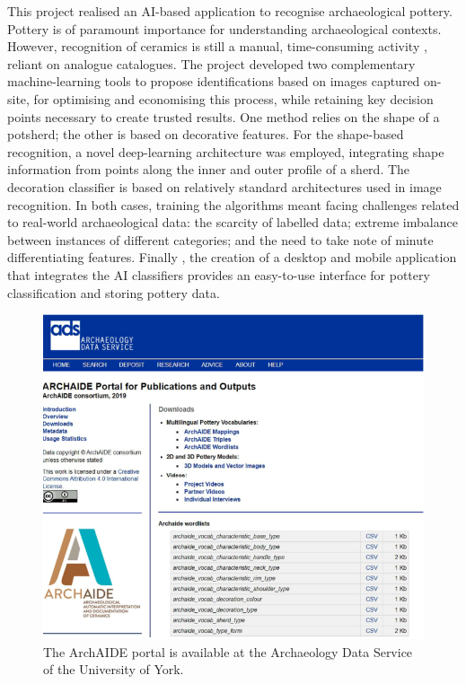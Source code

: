 \documentclass[journal]{IEEEtran}
\begin{document}
\begin{itemize}
		  This project  realised an AI-based application to recognise archaeological pottery.
		  Pottery is of paramount importance for understanding archaeological contexts. However, recognition of
		  ceramics is still a manual, time-consuming activity , reliant on analogue catalogues. The project
		  developed two complementary machine-learning tools to propose identifications based on images
		  captured on-site, for optimising and economising this process, while retaining key decision points
		  necessary to create trusted results. One method relies on the shape of a potsherd; the other is based
		  on decorative features. For the shape-based recognition, a novel deep-learning architecture was
		  employed, integrating shape information from points along the inner and outer profile of a sherd.
		  The decoration classifier is based on relatively standard architectures used in image recognition. In
		  both cases, training the algorithms meant facing challenges related to real-world archaeological data:
		  the scarcity of labelled data; extreme imbalance between instances of different categories; and the
		  need to take note of minute differentiating features. Finally , the creation of a desktop and mobile
		  application that integrates the AI classifiers provides an easy-to-use interface for pottery classification
		  and storing pottery data.
		  \begin{figure}[htbp]
			\centering
			\includegraphics[width=0.9\linewidth]{./picture/fig3.png}
			\caption{The ArchAIDE portal is available at the Archaeology Data Service of the University of York.}
		  \end{figure}

\end{itemize}
\end{document}
